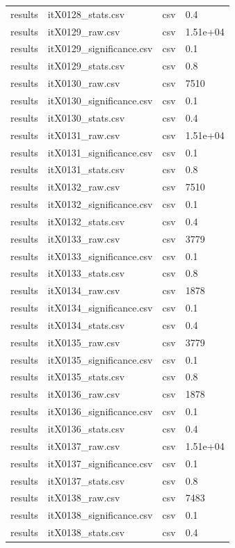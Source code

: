 \begin{landscape}
\begin{longtable}{p{}p{}p{}p{}}
results & itX0128\_stats.csv & csv & 0.4 \\
results & itX0129\_raw.csv & csv & 1.51e+04 \\
results & itX0129\_significance.csv & csv & 0.1 \\
results & itX0129\_stats.csv & csv & 0.8 \\
results & itX0130\_raw.csv & csv & 7510 \\
results & itX0130\_significance.csv & csv & 0.1 \\
results & itX0130\_stats.csv & csv & 0.4 \\
results & itX0131\_raw.csv & csv & 1.51e+04 \\
results & itX0131\_significance.csv & csv & 0.1 \\
results & itX0131\_stats.csv & csv & 0.8 \\
results & itX0132\_raw.csv & csv & 7510 \\
results & itX0132\_significance.csv & csv & 0.1 \\
results & itX0132\_stats.csv & csv & 0.4 \\
results & itX0133\_raw.csv & csv & 3779 \\
results & itX0133\_significance.csv & csv & 0.1 \\
results & itX0133\_stats.csv & csv & 0.8 \\
results & itX0134\_raw.csv & csv & 1878 \\
results & itX0134\_significance.csv & csv & 0.1 \\
results & itX0134\_stats.csv & csv & 0.4 \\
results & itX0135\_raw.csv & csv & 3779 \\
results & itX0135\_significance.csv & csv & 0.1 \\
results & itX0135\_stats.csv & csv & 0.8 \\
results & itX0136\_raw.csv & csv & 1878 \\
results & itX0136\_significance.csv & csv & 0.1 \\
results & itX0136\_stats.csv & csv & 0.4 \\
results & itX0137\_raw.csv & csv & 1.51e+04 \\
results & itX0137\_significance.csv & csv & 0.1 \\
results & itX0137\_stats.csv & csv & 0.8 \\
results & itX0138\_raw.csv & csv & 7483 \\
results & itX0138\_significance.csv & csv & 0.1 \\
results & itX0138\_stats.csv & csv & 0.4 \\

\end{longtable}
\end{landscape}
